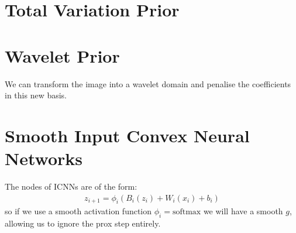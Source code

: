 \documentclass[a4paper,10pt]{article}
\numberwithin{equation}{section}
\numberwithin{thm}{section}
\begin{document}
 
\newpage
\section{Total Variation Prior}



\newpage
\section{Wavelet Prior}

We can transform the image into a wavelet domain and penalise the coefficients in this new basis. 





\newpage
\section{Smooth Input Convex Neural Networks}

The nodes of ICNNs are of the form:
\begin{align*}
 z_{i+1} = \phi_i ( B_i (z_i) + W_i(x_i) + b_i)	
\end{align*}
so if we use a smooth activation function $\phi_i = \text{softmax}$ we will have a smooth $g$, allowing us to ignore the prox step entirely. 
\end{document}
